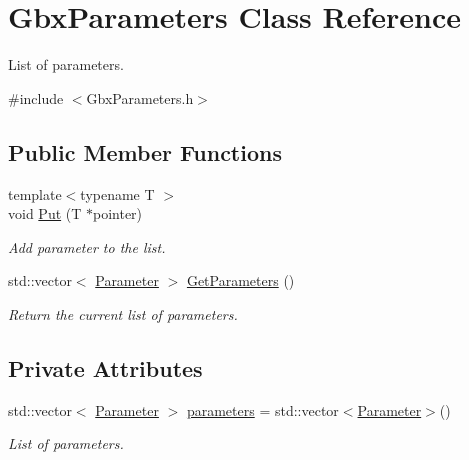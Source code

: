 \hypertarget{classGbxParameters}{\section{Gbx\-Parameters Class Reference}
\label{classGbxParameters}
}


List of parameters.  




{\ttfamily \#include $<$Gbx\-Parameters.\-h$>$}

\subsection*{Public Member Functions}
\begin{DoxyCompactItemize}
\item 
{\footnotesize template$<$typename T $>$ }\\void \hyperlink{classGbxParameters_a2cf83794717cf9fdc13e5ff12e259f04}{Put} (T $\ast$pointer)
\begin{DoxyCompactList}\small\item\em Add parameter to the list. \end{DoxyCompactList}\item 
\hypertarget{classGbxParameters_a0b80a76f2af231b5cd315c8a0af7770e}{std\-::vector$<$ \hyperlink{structParameter}{Parameter} $>$ \hyperlink{classGbxParameters_a0b80a76f2af231b5cd315c8a0af7770e}{Get\-Parameters} ()}\label{classGbxParameters_a0b80a76f2af231b5cd315c8a0af7770e}

\begin{DoxyCompactList}\small\item\em Return the current list of parameters. \end{DoxyCompactList}\end{DoxyCompactItemize}
\subsection*{Private Attributes}
\begin{DoxyCompactItemize}
\item 
\hypertarget{classGbxParameters_a6604ff8a98d2638dc760b51019657fcc}{std\-::vector$<$ \hyperlink{structParameter}{Parameter} $>$ \hyperlink{classGbxParameters_a6604ff8a98d2638dc760b51019657fcc}{parameters} = std\-::vector$<$\hyperlink{structParameter}{Parameter}$>$()}\label{classGbxParameters_a6604ff8a98d2638dc760b51019657fcc}

\begin{DoxyCompactList}\small\item\em List of parameters. \end{DoxyCompactList}\end{DoxyCompactItemize}


